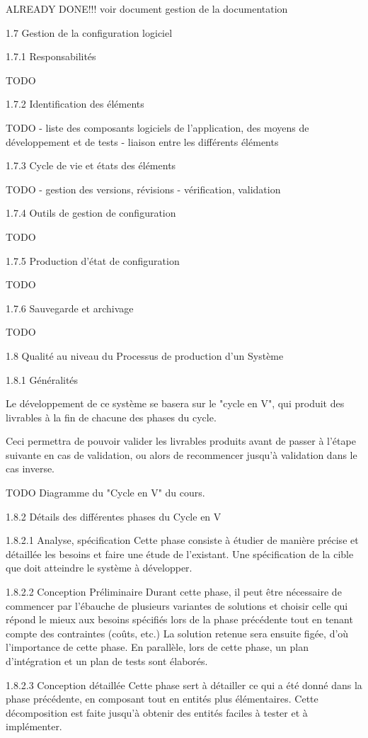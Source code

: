 ALREADY DONE!!! voir document gestion de la documentation

1.7   Gestion de la configuration logiciel

1.7.1   Responsabilités

TODO

1.7.2   Identification des éléments

TODO - liste des composants logiciels de l'application, des moyens de développement et de tests - liaison entre les différents éléments

1.7.3   Cycle de vie et états des éléments

TODO - gestion des versions, révisions - vérification, validation

1.7.4   Outils de gestion de configuration

TODO

1.7.5   Production d'état de configuration

TODO

1.7.6   Sauvegarde et archivage

TODO

1.8   Qualité au niveau du Processus de production d'un Système

1.8.1   Généralités

Le développement de ce système se basera sur le "cycle en V", qui produit des livrables à la fin de chacune des phases du cycle.

Ceci permettra de pouvoir valider les livrables produits avant de passer à l'étape suivante en cas de validation, ou alors de recommencer jusqu'à validation dans le cas inverse.

TODO Diagramme du "Cycle en V" du cours.

1.8.2   Détails des différentes phases du Cycle en V

1.8.2.1   Analyse, spécification
Cette phase consiste à étudier de manière précise et détaillée les besoins et faire une étude de l'existant. Une spécification de la cible que doit atteindre le système à développer.

1.8.2.2   Conception Préliminaire
Durant cette phase, il peut être nécessaire de commencer par l'ébauche de plusieurs variantes de solutions et choisir celle qui répond le mieux aux besoins spécifiés lors de la phase précédente tout en tenant compte des contraintes (coûts, etc.) La solution retenue sera ensuite figée, d'où l'importance de cette phase. En parallèle, lors de cette phase, un plan d'intégration et un plan de tests sont élaborés.

1.8.2.3   Conception détaillée
Cette phase sert à détailler ce qui a été donné dans la phase précédente, en composant tout en entités plus élémentaires. Cette décomposition est faite jusqu'à obtenir des entités faciles à tester et à implémenter.

